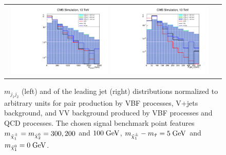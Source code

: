 \begin{figure}[tbh!]
	\centering
	\begin{tabular}{cc}
		\includegraphics[width=0.48\textwidth]{analysis/pics/h_dijetinvariantmass_prospects13tev.pdf}
		\includegraphics[width=0.48\textwidth]{analysis/pics/h_jet1pt_prospects13tev.pdf} 		
	\end{tabular}
	\caption{\ensuremath{m_{j_{1}j_{2}}} (left) and \pt of the leading jet (right) distributions normalized to arbitrary units for \charginopm \charginopm pair production by VBF processes, V+jets background, and VV background produced by VBF processes and QCD processes. The chosen signal benchmark point features \ensuremath{m_{\charginopm} = m_{\neutralinotwo} = 300, 200} and \ensuremath{100\gev}, \ensuremath{m_{\charginopm} - m_{\tilde{\tau}} = 5\gev} and \ensuremath{m_{\neutralinoone} = 0\gev}.}
	\label{fig:VBF_mjj_ptj1}
\end{figure}

